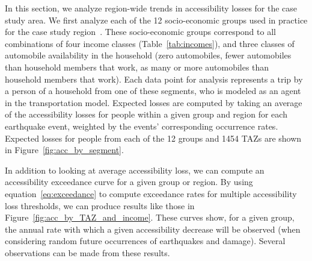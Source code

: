 In this section, we analyze region-wide trends in accessibility losses for the case study area. We first analyze each of the 12 socio-economic groups used in practice for the case study region~\cite{ory_personal_2013}. These socio-economic groups correspond to all combinations of four income classes (Table~\ref{tab:incomes}),
and three classes of automobile availability in the household (zero automobiles, fewer automobiles than household members that work, as many or more automobiles than household members that work). Each data point for analysis represents a trip by a person of a household from one of these segments, who is modeled as an agent in the transportation model.
Expected losses are computed by taking an average of the accessibility losses for people within a given group and region for each earthquake event, weighted by the events' corresponding occurrence rates. Expected losses for people from each of the 12 groups and 1454 TAZs are shown in Figure~\ref{fig:acc_by_segment}. 

In addition to looking at average accessibility loss, we can compute an accessibility exceedance curve for a given group or region. By using equation~\ref{eq:exceedance} to compute exceedance rates for multiple accessibility loss thresholds, we can produce results like those in Figure~\ref{fig:acc_by_TAZ_and_income}. These curves show, for a given group, the annual rate with which a given accessibility decrease will be observed (when considering random future occurrences of earthquakes and damage). Several observations can be made from these results. 


 
